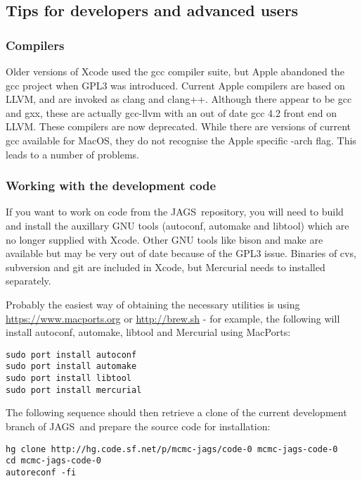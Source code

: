 \documentclass[11pt, a4paper, titlepage]{article}
\newcommand{\JAGS}{\textsf{JAGS}}
\begin{document}
\subsection{Tips for developers and advanced users}

\subsubsection{Compilers}

Older versions of Xcode used the gcc compiler suite, but Apple abandoned
the gcc project when GPL3 was introduced.  Current Apple compilers are
based on LLVM, and are invoked as clang and clang++.  Although there
appear to be gcc and gxx, these are actually gcc-llvm with an out of
date gcc 4.2 front end on LLVM.  These compilers are now deprecated.
While there are versions of current gcc available for MacOS, they do not
recognise the Apple specific -arch flag.  This leads to a number of
problems.

\subsubsection{Working with the development code}

If you want to work on code from the \JAGS\ repository, you will need to
build and install the auxillary GNU tools (autoconf, automake and
libtool) which are no longer supplied with Xcode.  Other GNU tools like
bison and make are available but may be very out of date because of the
GPL3 issue. Binaries of cvs, subversion and git are included in Xcode,
but Mercurial needs to installed separately.

Probably the easiest way of obtaining the necessary utilities is using
\url{https://www.macports.org} or \url{http://brew.sh}  - for example,
the following will install autoconf, automake, libtool and Mercurial
using MacPorts:

\begin{verbatim}
sudo port install autoconf
sudo port install automake
sudo port install libtool
sudo port install mercurial
\end{verbatim}

The following sequence should then retrieve a clone of the current
development branch of \JAGS\ and prepare the source code for
installation:

\begin{verbatim} 
hg clone http://hg.code.sf.net/p/mcmc-jags/code-0 mcmc-jags-code-0
cd mcmc-jags-code-0
autoreconf -fi
\end{verbatim}
\end{document}
